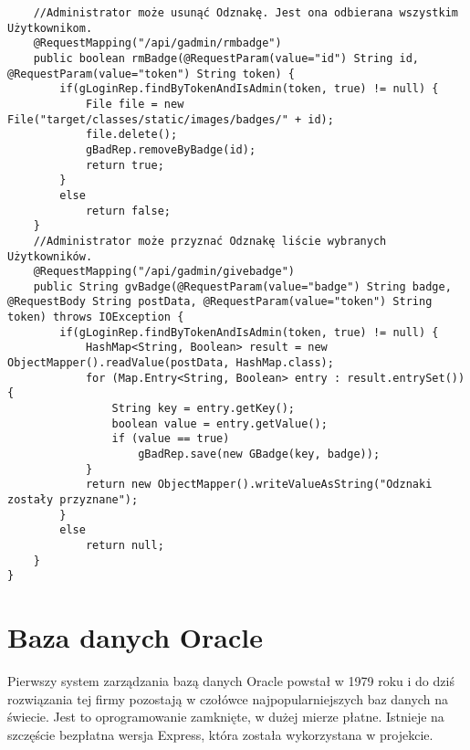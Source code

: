 \documentclass[a4paper,12pt,twoside,openany]{report}
\begin{document}
\begin{lstlisting}
    //Administrator może usunąć Odznakę. Jest ona odbierana wszystkim Użytkownikom.
    @RequestMapping("/api/gadmin/rmbadge")
    public boolean rmBadge(@RequestParam(value="id") String id, @RequestParam(value="token") String token) {
        if(gLoginRep.findByTokenAndIsAdmin(token, true) != null) {
            File file = new File("target/classes/static/images/badges/" + id);
            file.delete();
            gBadRep.removeByBadge(id);
            return true;
        }
        else
            return false;
    }
    //Administrator może przyznać Odznakę liście wybranych Użytkowników.
    @RequestMapping("/api/gadmin/givebadge")
    public String gvBadge(@RequestParam(value="badge") String badge, @RequestBody String postData, @RequestParam(value="token") String token) throws IOException {
        if(gLoginRep.findByTokenAndIsAdmin(token, true) != null) {
            HashMap<String, Boolean> result = new ObjectMapper().readValue(postData, HashMap.class);
            for (Map.Entry<String, Boolean> entry : result.entrySet()) {
                String key = entry.getKey();
                boolean value = entry.getValue();
                if (value == true)
                    gBadRep.save(new GBadge(key, badge));
            }
            return new ObjectMapper().writeValueAsString("Odznaki zostały przyznane");
        }
        else
            return null;
    }
}

\end{lstlisting}
\chapter{Baza danych Oracle}
Pierwszy system zarządzania bazą danych Oracle powstał w 1979 roku i do dziś rozwiązania tej firmy pozostają w czołówce najpopularniejszych baz danych na świecie. Jest to oprogramowanie zamknięte, w dużej mierze płatne. Istnieje na szczęście bezpłatna wersja Express, która została wykorzystana w projekcie.
\end{document}
